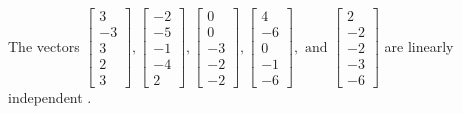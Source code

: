 \begin{exercise}
\begin{exerciseStatement}
  \end{exerciseStatement}
  \begin{exerciseAnswer}
   The vectors \(\left[\begin{array}{r}
3 \\
-3 \\
3 \\
2 \\
3
\end{array}\right] , \left[\begin{array}{r}
-2 \\
-5 \\
-1 \\
-4 \\
2
\end{array}\right] , \left[\begin{array}{r}
0 \\
0 \\
-3 \\
-2 \\
-2
\end{array}\right] , \left[\begin{array}{r}
4 \\
-6 \\
0 \\
-1 \\
-6
\end{array}\right] , \text{ and } \left[\begin{array}{r}
2 \\
-2 \\
-2 \\
-3 \\
-6
\end{array}\right]\) are 
  	 linearly independent  .
  


  \end{exerciseAnswer}
\end{exercise}